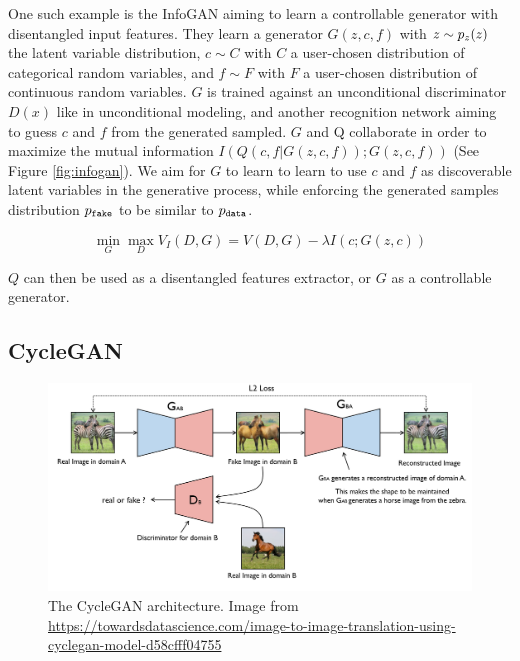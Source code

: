 One such example is the InfoGAN \citep{infogan} aiming to learn a controllable generator with disentangled input features. They learn a generator $G(z, c, f)$ with $z \sim p_z(z)$ the latent variable distribution, $c \sim C$ with $C$ a user-chosen distribution of categorical random variables, and $f \sim F$ with $F$ a user-chosen distribution of continuous random variables. $G$ is trained against an unconditional discriminator $D(x)$ like in unconditional modeling, and another recognition network aiming to guess $c$ and $f$ from the generated sampled. $G$ and Q collaborate in order to maximize the mutual information $I(Q(c, f|G(z, c, f)); G(z, c, f))$ (See Figure \ref{fig:infogan}). We aim for $G$ to learn to learn to use $c$ and $f$ as discoverable latent variables in the generative process, while enforcing the generated samples distribution $p_\texttt{fake}$ to be similar to $p_\texttt{data}$.

\begin{equation}
    \min_G \max_D V_I(D, G) = V(D, G) − \lambda I(c; G(z, c))   
\end{equation}

$Q$ can then be used as a disentangled features extractor, or $G$ as a controllable generator.

\subsection{CycleGAN}

\begin{figure}
    \centering
    \includegraphics[width=\columnwidth]{60-files/cyclegan.png}
    \caption{The CycleGAN architecture. Image from \url{https://towardsdatascience.com/image-to-image-translation-using-cyclegan-model-d58cfff04755}}
    \label{fig:cyclegan}
\end{figure}

